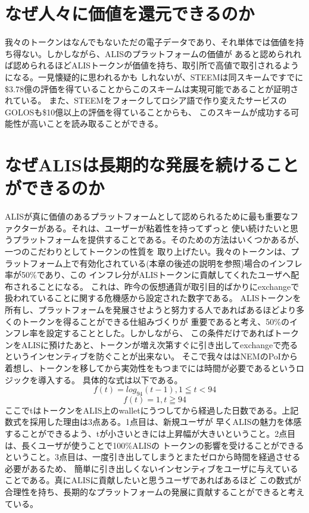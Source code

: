 \documentclass{jsarticle}
\begin{document}
\section{なぜ人々に価値を還元できるのか}
我々のトークンはなんでもないただの電子データであり、それ単体では価値を持ち得ない。しかしながら、ALISのプラットフォームの価値が
あると認められれば認められるほどALISトークンが価値を持ち、取引所で高値で取引されるようになる。一見懐疑的に思われるかも
しれないが、STEEMは同スキームですでに\$3.78億の評価を得ていることからこのスキームは実現可能であることが証明されている。
また、STEEMをフォークしてロシア語で作り変えたサービスのGOLOSも\$10億以上の評価を得ていることからも、
このスキームが成功する可能性が高いことを読み取ることができる。
\section{なぜALISは長期的な発展を続けることができるのか}
ALISが真に価値のあるプラットフォームとして認められるために最も重要なファクターがある。それは、ユーザーが粘着性を持ってずっと
使い続けたいと思うプラットフォームを提供することである。そのための方法はいくつかあるが、一つのこだわりとしてトークンの性質を
取り上げたい。我々のトークンは、プラットフォーム上で有効化されている(本章の後述の説明を参照)場合のインフレ率が50\%であり、この
インフレ分がALISトークンに貢献してくれたユーザへ配布されることになる。
これは、昨今の仮想通貨が取引目的ばかりにexchangeで扱われていることに関する危機感から設定された数字である。
ALISトークンを所有し、プラットフォームを発展させようと努力する人であればあるほどより多くのトークンを得ることができる仕組みづくりが
重要であると考え、50\%のインフレ率を設定することとした。しかしながら、
この条件だけであればトークンをALISに預けたあと、トークンが増え次第すぐに引き出してexchangeで売るというインセンティブを防ぐことが出来ない。
そこで我々ははNEMのPoIから着想し、トークンを移してから実効性をもつまでには時間が必要であるというロジックを導入する。
具体的な式は以下である。
\begin{equation}
f(t) = log_{94}(t-1) , 1 ≦ t < 94
\end{equation}
\begin{equation}
f(t) = 1 , t ≧ 94
\end{equation}
ここでtはトークンをALIS上のwalletにうつしてから経過した日数である。上記数式を採用した理由は3点ある。1点目は、新規ユーザが
早くALISの魅力を体感することができるよう、tが小さいときには上昇幅が大きいということ。2点目は、長くユーザが使うことで100\%ALISの
トークンの影響を受けることができるということ。3点目は、一度引き出してしまうとまたゼロから時間を経過させる必要があるため、
簡単に引き出しくないインセンティブをユーザに与えていることである。真にALISに貢献したいと思うユーザであればあるほど
この数式が合理性を持ち、長期的なプラットフォームの発展に貢献することができると考えている。
\end{document}
